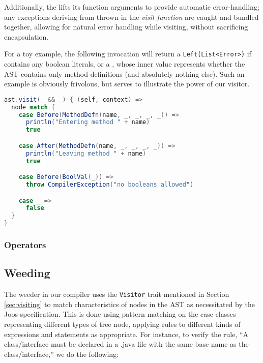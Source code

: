 \documentclass{article}
\begin{document}
Additionally, the \value{Visitor} lifts its function arguments to provide automatic error-handling; any exceptions
deriving from  thrown in the \textit{visit function} are caught and bundled together, allowing for
natural error handling while visiting, without sacrificing encapsulation.

For a toy example, the following invocation will return a \texttt{Left(List<Error>)} if \value{ast} contains any boolean
literals, or a \value{Right(Boolean)}, whose inner value represents whether the AST contains only method definitions
(and absolutely nothing else). Such an example is obviously frivolous, but serves to illustrate the power of our
visitor.

\begin{lstlisting}[language=Scala]
ast.visit(_ && _) { (self, context) =>
  node match {
    case Before(MethodDefn(name, _, _, _, _)) =>
      println("Entering method " + name)
      true

    case After(MethodDefn(name, _, _, _, _)) =>
      println("Leaving method " + name)
      true

    case Before(BoolVal(_)) =>
      throw CompilerException("no booleans allowed")

    case _ =>
      false
  }
}
\end{lstlisting}




\subsubsection{Operators}







\subsection{Weeding}
The weeder in our compiler uses the {\tt Visitor} trait mentioned in Section \ref{sec:visiting} to match
characteristics of nodes in the AST as necessitated by the Joos specification. This is done using pattern matching
on the case classes representing different types of tree node, applying rules to different kinds of expressions and
statements as appropriate. For instance, to verify the rule, ``A class/interface must be declared in a
.java file with the same base name as the class/interface,'' we do the following:
\end{document}
